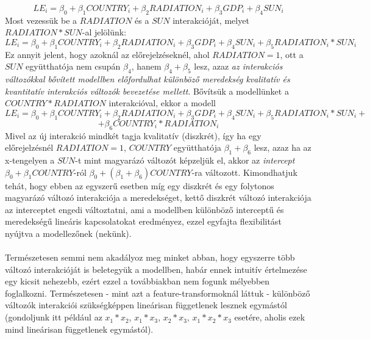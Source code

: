 \documentclass[14p]{report}
\newcounter{x}
\newcounter{y}
\newcounter{z}
\begin{document}
	\[
		LE_i = \beta_0 + \beta_1 COUNTRY_i + \beta_2 RADIATION_i + \beta_3 GDP_i + \beta_4 SUN_i
	\]
	Most vezessük be a $RADIATION$ és a $SUN$ interakcióját, melyet $RADIATION*SUN$-al jelölünk:
	\[
		LE_i = \beta_0 + \beta_1 COUNTRY_i + \beta_2 RADIATION_i + \beta_3 GDP_i + \beta_4 SUN_i + \beta_5 RADIATION_i * SUN_i
	\]
	Ez annyit jelent, hogy azoknál az előrejelzéseknél, ahol $RADIATION = 1$, ott a $SUN$ együtthatója nem csupán $\beta_4$, hanem $\beta_4 + \beta_5$ lesz, azaz \emph{az interakciós változókkal bővített modellben előfordulhat különböző meredekség kvalitatív és kvantitatív interakciós változók bevezetése mellett}. Bővítsük a modellünket a $COUNTRY * RADIATION$ interakcióval, ekkor a modell
	\[
		LE_i = \beta_0 + \beta_1 COUNTRY_i + \beta_2 RADIATION_i + \beta_3 GDP_i + \beta_4 SUN_i + \beta_5 RADIATION_i * SUN_i + 
	\]
	\[
		+ \beta_6 COUNTRY_i * RADIATION_i
	\]
	Mivel az új interakció mindkét tagja kvalitatív (diszkrét), így ha egy előrejelzésnél $RADIATION = 1$, $COUNTRY$ együtthatója $\beta_1 + \beta_6$ lesz, azaz ha az x-tengelyen a $SUN$-t mint magyarázó változót képzeljük el, akkor az \emph{intercept} $\beta_0 + \beta_1 COUNTRY$-ról $\beta_0 + (\beta_1 + \beta_6) COUNTRY$-ra változott. Kimondhatjuk tehát, hogy ebben az egyszerű esetben míg egy diszkrét és egy folytonos magyarázó változó interakciója a meredekséget, kettő diszkrét változó interakciója az interceptet engedi változtatni, ami a modellben különböző interceptű és meredekségű lineáris kapcsolatokat eredményez, ezzel egyfajta flexibilitást nyújtva a modellezőnek (nekünk).
	\\
	\\
	Természetesen semmi nem akadályoz meg minket abban, hogy egyszerre több változó interakcióját is beletegyük a modellben, habár ennek intuitív értelmezése egy kicsit nehezebb, ezért ezzel a továbbiakban nem fogunk mélyebben foglalkozni. Természetesen - mint azt a feature-transformoknál láttuk - különböző változók interakciói szükségképpen lineárisan függetlenek lesznek egymástól (gondoljunk itt például az $x_1*x_2$, $x_1*x_3$, $x_2*x_3$, $x_1*x_2*x_3$ esetére, aholis ezek mind lineárisan függetlenek egymástól).
	
	
\end{document}
